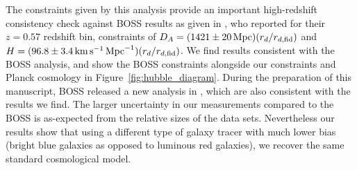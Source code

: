 \documentclass[a4paper,fleqn,usenatbib]{mnras}
\begin{document}
The constraints given by this analysis provide an important high-redshift consistency check against BOSS results as given in \cite{AndersonAubourg2014DR11}, who reported for their $z=0.57$ redshift bin, constraints of $D_A= (1421\pm20\, {\rm Mpc}) (r_d/r_{d,{\rm fid}})$ and $H = (96.8\pm3.4 \,{\rm km}\,{\rm s}^{-1}\,{\rm Mpc}^{-1})(r_d/r_{d,{\rm fid}})$. We find results consistent with the BOSS analysis, and show the BOSS constraints alongside our constraints and Planck cosmology in Figure~\ref{fig:hubble_diagram}. During the preparation of this manuscript, BOSS released a new analysis in \citet{AlamAta2016}, which are also consistent with the results we find. The larger uncertainty in our measurements compared to the BOSS is as-expected from the relative sizes of the data sets.  Nevertheless our results show that using a different type of galaxy tracer with much lower bias (bright blue galaxies as opposed to luminous red galaxies), we recover the same standard cosmological model. 
\end{document}
